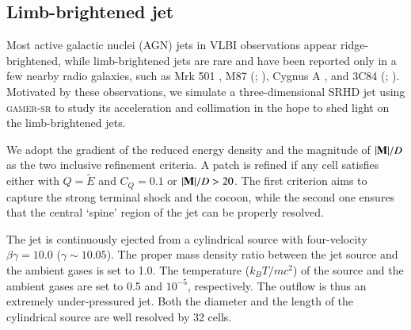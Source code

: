 \documentclass[twocolumn]{aastex63}
\begin{document}
\subsection{Limb-brightened jet}
\label{Limb-brightened jet}
Most active galactic nuclei (AGN) jets in VLBI observations appear ridge-brightened, while limb-brightened jets are rare and have been reported only in a few nearby radio galaxies, such as Mrk 501 \citep{Giroletti2004}, M87 (\citealt{Asada2012}; \citealt{Kim2018}), Cygnus A \citep{Boccardi2015}, and 3C84 (\citealt{Nagai_2014}; \citealt{Giovannini2018}). Motivated by these observations, we simulate a three-dimensional SRHD jet using \textsc{gamer-sr} to study its acceleration and collimation in the hope to shed light on the limb-brightened jets.

We adopt the gradient of the reduced energy density and the magnitude of $\abs{\mathbf{M}}/D$ as the two inclusive refinement criteria. A patch is refined if any cell satisfies either  with $Q=\tilde{E}$ and $C_{Q}=0.1$ or $\abs{\mathbf{M}}/D>20$. The first criterion aims to capture the strong terminal shock and the cocoon, while the second one ensures that the central `spine' region of the jet can be properly resolved.

The jet is continuously ejected from a cylindrical source with four-velocity $\beta\gamma=10.0$ ($\gamma \sim 10.05$). The proper mass density ratio between the jet source and the ambient gases is set to 1.0. The temperature ($k_{B}T/mc^2$) of the source and the ambient gases are set to 0.5 and $10^{-5}$, respectively. The outflow is thus an extremely under-pressured jet. Both the diameter and the length of the cylindrical source are well resolved by 32 cells.
\end{document}

